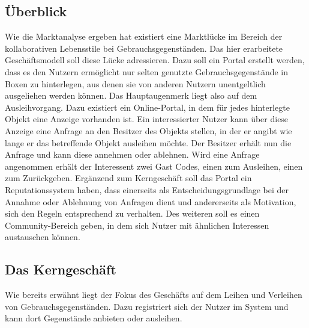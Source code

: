 \documentclass[a4paper]{scrartcl}
\begin{document}
\begin{multicols}{2}
		
		\subsection{\"Uberblick}
			Wie die Marktanalyse ergeben hat existiert eine Marktl\"ucke im Bereich der kollaborativen Lebensstile bei Gebrauchsgegenst\"anden. Das hier erarbeitete Gesch\"aftsmodell soll diese L\"ucke adressieren. Dazu soll ein Portal erstellt werden, dass es den Nutzern erm\"oglicht nur selten genutzte Gebrauchsgegenst\"ande in Boxen zu hinterlegen, aus denen sie von anderen Nutzern unentgeltlich ausgeliehen werden k\"onnen. Das Hauptaugenmerk liegt also auf dem Ausleihvorgang. Dazu existiert ein Online-Portal, in dem f\"ur jedes hinterlegte Objekt eine Anzeige vorhanden ist. Ein interessierter Nutzer kann \"uber diese Anzeige eine Anfrage an den Besitzer des Objekts stellen, in der er angibt wie lange er das betreffende Objekt ausleihen m\"ochte. Der Besitzer erh\"alt nun die Anfrage und kann diese annehmen oder ablehnen. Wird eine Anfrage angenommen erh\"alt der Interessent zwei Gast Codes, einen zum Ausleihen, einen zum Zur\"uckgeben. Erg\"anzend zum Kerngesch\"aft soll das Portal ein Reputationssystem haben, dass einerseits als Entscheidungsgrundlage bei der Annahme oder Ablehnung von Anfragen dient und andererseits als Motivation, sich den Regeln entsprechend zu verhalten. Des weiteren soll es einen Community-Bereich geben, in dem sich Nutzer mit \"ahnlichen Interessen austauschen k\"onnen.
			
			
		\subsection{Das Kerngesch\"aft}
			Wie bereits erw\"ahnt liegt der Fokus des Gesch\"afts auf dem Leihen und Verleihen von Gebrauchsgegenst\"anden. Dazu registriert sich der Nutzer im System und kann dort Gegenst\"ande anbieten oder ausleihen.
			

\end{multicols}
\end{document}
